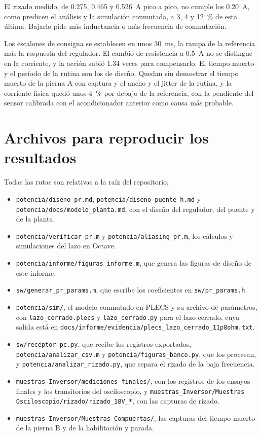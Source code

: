 \documentclass[journal]{IEEEtran}
\begin{document}
El rizado medido, de \num{0.275}, \num{0.465} y \SI{0.526}{A} pico a pico, no cumple los \SI{0.20}{A}, como predicen el análisis y la simulación conmutada, a \num{3}, \num{4} y \SI{12}{\percent} de esta última. Bajarlo pide más inductancia o más frecuencia de conmutación.

Los escalones de consigna se establecen en unos \SI{30}{ms}, la rampa de la referencia más la respuesta del regulador. El cambio de resistencia a \SI{0.5}{A} no se distingue en la corriente, y la acción subió \num{1.34} veces para compensarlo. El tiempo muerto y el período de la rutina son los de diseño. Quedan sin demostrar el tiempo muerto de la pierna A con captura y el ancho y el jitter de la rutina, y la corriente física quedó unos \SI{4}{\percent} por debajo de la referencia, con la pendiente del sensor calibrada con el acondicionador anterior como causa más probable.

\appendix
\section{Archivos para reproducir los resultados}
\label{app:archivos}
Todas las rutas son relativas a la raíz del repositorio.

\begin{itemize}
	\item \texttt{potencia/diseno\_pr.md}, \texttt{potencia/diseno\_puente\_h.md} y \texttt{potencia/docs/modelo\_planta.md}, con el diseño del regulador, del puente y de la planta.
	\item \texttt{potencia/verificar\_pr.m} y \texttt{potencia/aliasing\_pr.m}, los cálculos y simulaciones del lazo en Octave.
	\item \texttt{potencia/informe/figuras\_informe.m}, que genera las figuras de diseño de este informe.
	\item \texttt{sw/generar\_pr\_params.m}, que escribe los coeficientes en \texttt{sw/pr\_params.h}.
	\item \texttt{potencia/sim/}, el modelo conmutado en PLECS y su archivo de parámetros, con \texttt{lazo\_cerrado.plecs} y \texttt{lazo\_cerrado.py} para el lazo cerrado, cuya salida está en \texttt{docs/\allowbreak informe/\allowbreak evidencia/\allowbreak plecs\_lazo\_cerrado\_11p8ohm.txt}.
	\item \texttt{sw/receptor\_pc.py}, que recibe los registros exportados, \texttt{potencia/analizar\_csv.m} y \texttt{potencia/figuras\_banco.py}, que los procesan, y \texttt{potencia/analizar\_rizado.py}, que separa el rizado de la baja frecuencia.
	\item \texttt{muestras\_Inversor/\allowbreak mediciones\_finales/}, con los registros de los ensayos finales y los transitorios del osciloscopio, y \texttt{muestras\_Inversor/\allowbreak Muestras Osciloscopio/\allowbreak rizado/\allowbreak rizado\_18V\_*}, con las capturas de rizado.
	\item \texttt{muestras\_Inversor/\allowbreak Muestras Compuertas/}, las capturas del tiempo muerto de la pierna B y de la habilitación y parada.
\end{itemize}
\end{document}
